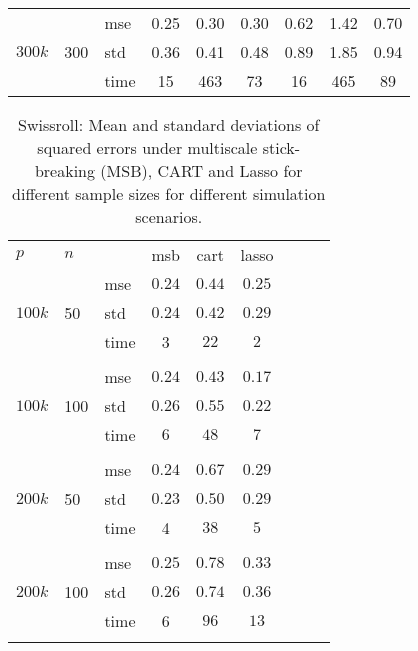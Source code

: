 \documentclass{article} %
\begin{document}
\begin{table}[t]
\begin{center}
\begin{small}
\begin{sc}
\begin{tabular}{lllcccccc}
\\
\multirow{3}{*}{$300k$}&\multirow{3}{*}{300}&mse&0.25&0.30&0.30&0.62&1.42&0.70\\
&&std &0.36&0.41&0.48&0.89&1.85&0.94\\
&&time &15&463&73&16&465&89\\

\hline
\end{tabular}
\end{sc}
\end{small}
\end{center}
\vskip -0.1in
\end{table}



\begin{table}[t]
\caption{Swissroll: Mean and standard deviations of squared errors under multiscale stick-breaking (MSB), CART and Lasso for different sample sizes for different simulation scenarios.}\label{table:swiss}
\vskip 0.15in
\begin{center}
\begin{small}
\begin{sc}
\begin{tabular}{lllcccccc}
\hline
$p$&$n$& & msb&cart& lasso\\
\multirow{3}{*}{$100k$}&\multirow{3}{*}{50}&mse &$0.24$&$0.44$&$0.25$\\
&&std & $0.24$ & $0.42$&$0.29$\\
&&time & 3 & $22$&$2$ \\

\\
\multirow{3}{*}{$100k$}&\multirow{3}{*}{100}&mse &$0.24$ & $0.43$&$0.17$\\
&&std & $0.26$&$0.55$&$0.22$\\
&&time&$6$&$48$&$7$\\

\\

\multirow{3}{*}{$200k$}&\multirow{3}{*}{50}&mse &$0.24$&$0.67$&$0.29$\\
&&std & $0.23$ & $0.50$& $0.29$\\
&&time & 4& $38$& $5$ \\
\\
\multirow{3}{*}{$200k$}&\multirow{3}{*}{100}&mse &$0.25$&$0.78$&$0.33$\\
&&std & $0.26$ & $0.74$&$0.36$\\
&&time &6 &$96$&$13$\\
\\


\end{tabular}
\end{sc}
\end{small}
\end{center}
\end{table}
\end{document}
